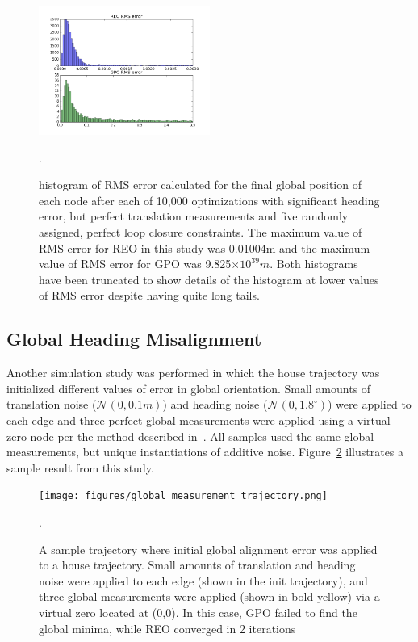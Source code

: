 \begin{figure}[H]
  \includegraphics[width=0.5\textwidth]{figures/GPO_vs_REO_bad.png}
  \caption{histogram of RMS error calculated for the final global position of each node after each of 10,000 optimizations with significant heading error, but perfect translation measurements and five randomly assigned, perfect loop closure constraints. The maximum value of RMS error for REO in this study was 0.01004m and the maximum value of RMS error for GPO was 9.825$\times 10 ^{39}m$. Both histograms have been truncated to show details of the histogram at lower values of RMS error despite having quite long tails.}
  \label{fig:GPO_bad_histogram}.
\end{figure}


\subsection{Global Heading Misalignment}

Another simulation study was performed in which the house trajectory was initialized different values of error in global orientation. Small amounts of translation noise ($\mathcal{N}(0, 0.1m)$) and heading noise ($\mathcal{N}(0, 1.8^\circ)$) were applied to each edge and three perfect global measurements were applied using a virtual zero node per the method described in~\cite{CITE}.  All samples used the same global measurements, but unique instantiations of additive noise. Figure~\ref{fig:global_heading_error_trajectory} illustrates a sample result from this study.

\begin{figure}[H]
  \texttt{[image: figures/global\_measurement\_trajectory.png]}
  \caption{A sample trajectory where initial global alignment error was applied to a house trajectory.  Small amounts of translation and heading noise were applied to each edge (shown in the init trajectory), and three global measurements were applied (shown in bold yellow) via a virtual zero located at (0,0).  In this case, GPO failed to find the global minima, while REO converged in 2 iterations}
  \label{fig:global_heading_error_trajectory}.
\end{figure}


